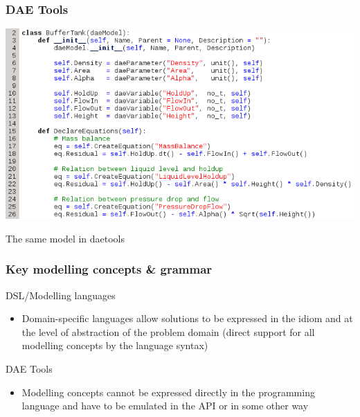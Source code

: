 \documentclass[compress,newPxFont,sthlmFooter]{beamer}
\begin{document}
\begin{frame}
\frametitle{DAE Tools}
  \begin{center}
    \includegraphics[width=0.85\paperwidth]{../_static/daetools_model.png}
  \end{center}
  \begin{center}
    {\small The same model in daetools}
  \end{center}
\end{frame}

\begin{frame}
\frametitle{Key modelling concepts \& grammar}
\begin{block}{\textcolor{light_green}{DSL/Modelling languages}}
\begin{itemize}
  \item Domain-specific languages allow solutions to be expressed in the idiom and at the level of abstraction of the problem domain 
        (direct support for all modelling concepts by the language syntax)
\end{itemize}
\end{block}

\begin{block}{\textcolor{light_red}{DAE Tools}}
\begin{itemize}
  \item Modelling concepts cannot be expressed directly in the programming language and have to be emulated in the API or in 
        some other way
\end{itemize}
\end{block}
\end{frame}
\end{document}
